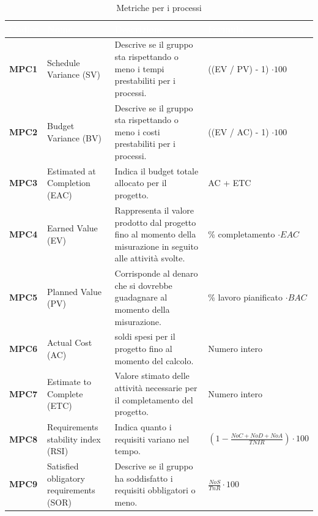 \renewcommand{\arraystretch}{1.5}
\renewcommand\extrarowheight{1.5pt}
\begin{longtable}{C{1.5cm} C{4.5cm} C{5cm} C{4.5cm}}
		\textcolor{white}{\textbf{Codice}} & 
		\textcolor{white}{\textbf{Nome}} & 
		\textcolor{white}{\textbf{Descrizione}} & 
		\textcolor{white}{\textbf{Formula}} \\
		\endfirsthead
	    \endfoot
	    \caption{Metriche per i processi}
	    \endlastfoot
		\hline
		\textbf{MPC1} & 
		Schedule Variance (SV)  & 
		Descrive se il gruppo sta rispettando o meno i tempi prestabiliti per i processi. & 
		((EV / PV) - 1) $\cdot 100$ \\
		
		\textbf{MPC2} & 
		Budget Variance (BV) & 
		Descrive se il gruppo sta rispettando o meno i costi prestabiliti per i processi. & 
		((EV / AC) - 1) $\cdot 100$ \\
		
		\textbf{MPC3} &
		Estimated at Completion (EAC) &
		Indica il budget totale allocato per il progetto. &
		AC + ETC \\
		
		\textbf{MPC4} &
		Earned Value (EV) &
		Rappresenta il valore prodotto dal progetto fino al momento della misurazione in seguito alle attività svolte.  &
		\% completamento $ \cdot EAC $\\
				
		\textbf{MPC5} &
		Planned Value (PV) &
		Corrisponde al denaro che si dovrebbe guadagnare al momento della misurazione.  &
		\% lavoro pianificato $ \cdot BAC $ \\
		
		\textbf{MPC6} &
		Actual Cost (AC) &
		soldi spesi per il progetto fino al momento del calcolo. &
		Numero intero \\
		
		\textbf{MPC7} &
		Estimate to Complete (ETC) &
		Valore stimato delle attività necessarie per il completamento del progetto.  &
		Numero intero \\	
			
		
		\textbf{MPC8} &
		Requirements stability index (RSI) &
		Indica quanto i requisiti variano nel tempo. &
		$(1 - \frac{NoC + NoD + NoA}{TNIR}) \cdot 100$ \\
		
		\textbf{MPC9} &
		Satisfied obligatory requirements (SOR) &
		Descrive se il gruppo ha soddisfatto i requisiti obbligatori o meno. &
		$\frac{NoS}{TnR} \cdot 100$ \\ 
		

\end{longtable}
